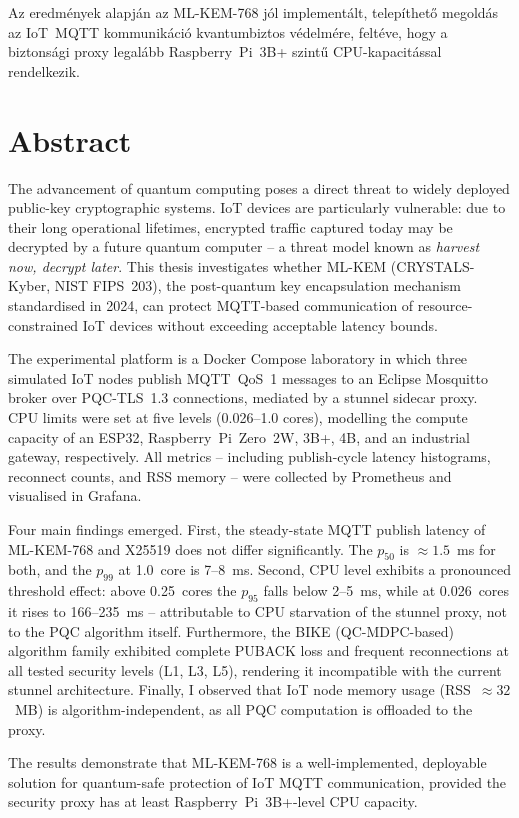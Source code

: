 Az eredmények alapján az ML-KEM-768 jól implementált, telepíthető megoldás az IoT~MQTT kommunikáció kvantumbiztos védelmére, feltéve, hogy a biztonsági proxy legalább Raspberry~Pi~3B+ szintű CPU-kapacitással rendelkezik.


\vfill
\selectenglish


\chapter*{Abstract}

The advancement of quantum computing poses a direct threat to widely deployed public-key cryptographic systems. IoT devices are particularly vulnerable: due to their long operational lifetimes, encrypted traffic captured today may be decrypted by a future quantum computer -- a threat model known as \emph{harvest now, decrypt later}. This thesis investigates whether ML-KEM (CRYSTALS-Kyber, NIST FIPS~203), the post-quantum key encapsulation mechanism standardised in 2024, can protect MQTT-based communication of resource-constrained IoT devices without exceeding acceptable latency bounds.

The experimental platform is a Docker Compose laboratory in which three simulated IoT nodes publish MQTT~QoS~1 messages to an Eclipse Mosquitto broker over PQC-TLS~1.3 connections, mediated by a stunnel sidecar proxy. CPU limits were set at five levels (0.026--1.0 cores), modelling the compute capacity of an ESP32, Raspberry~Pi~Zero~2W, 3B+, 4B, and an industrial gateway, respectively. All metrics -- including publish-cycle latency histograms, reconnect counts, and RSS memory -- were collected by Prometheus and visualised in Grafana.

Four main findings emerged. First, the steady-state MQTT publish latency of ML-KEM-768 and X25519 does not differ significantly. The $p_{50}$ is $\approx 1.5$~ms for both, and the $p_{99}$ at 1.0~core is 7--8~ms. Second, CPU level exhibits a pronounced threshold effect: above 0.25~cores the $p_{95}$ falls below 2--5~ms, while at 0.026~cores it rises to 166--235~ms -- attributable to CPU starvation of the stunnel proxy, not to the PQC algorithm itself. Furthermore, the BIKE (QC-MDPC-based) algorithm family exhibited complete PUBACK loss and frequent reconnections at all tested security levels (L1, L3, L5), rendering it incompatible with the current stunnel architecture. Finally, I observed that IoT node memory usage (RSS~$\approx 32$~MB) is algorithm-independent, as all PQC computation is offloaded to the proxy.

The results demonstrate that ML-KEM-768 is a well-implemented, deployable solution for quantum-safe protection of IoT MQTT communication, provided the security proxy has at least Raspberry~Pi~3B+-level CPU capacity.


\vfill
\selectthesislanguage

\setcounter{romanPage}{\value{page}}

